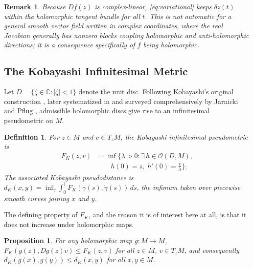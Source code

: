 \documentclass[preprint,12pt,authoryear]{elsarticle}
\newtheorem{remark}{Remark}
\newtheorem{definition}{Definition}
\newtheorem{proposition}{Proposition}
\begin{document}
\begin{remark}
Because $Df(z)$ is complex-linear, \eqref{eq:variational} keeps $\delta z(t)$ within the holomorphic tangent bundle for all $t$. This is not automatic for a general smooth vector field written in complex coordinates, where the real Jacobian generally has nonzero blocks coupling holomorphic and anti-holomorphic directions; it is a consequence specifically of $f$ being holomorphic.
\end{remark}

\subsection{The Kobayashi Infinitesimal Metric}

Let $D=\{\zeta\in\mathbb{C}:|\zeta|<1\}$ denote the unit disc. Following Kobayashi's original construction \cite{kobayashi1967invariant}, later systematized in \cite{kobayashi1998hyperbolic} and surveyed comprehensively by Jarnicki and Pflug \cite{jarnicki2013invariant}, admissible holomorphic discs give rise to an infinitesimal pseudometric on $M$.

\begin{definition}
\label{def:FK}
For $z\in M$ and $v\in T_zM$, the Kobayashi infinitesimal pseudometric is
\begin{equation}
\label{eq:FK}
\begin{aligned}
F_K(z,v)
&=
\inf\Big\{\lambda>0:\exists\,h\in\mathcal{O}(D,M),\\
&\qquad h(0)=z,\;
h'(0)=\frac{v}{\lambda}\Big\}.
\end{aligned}
\end{equation}
The associated Kobayashi pseudodistance is $d_K(x,y)=\inf_\gamma\int_0^1 F_K(\gamma(s),\dot\gamma(s))\,ds$, the infimum taken over piecewise smooth curves joining $x$ and $y$.
\end{definition}

The defining property of $F_K$, and the reason it is of interest here at all, is that it does not increase under holomorphic maps.

\begin{proposition}
\label{prop:schwarzpick}
For any holomorphic map $g:M\to M$, $F_K(g(z),Dg(z)v)\le F_K(z,v)$ for all $z\in M$, $v\in T_zM$, and consequently $d_K(g(x),g(y))\le d_K(x,y)$ for all $x,y\in M$.
\end{proposition}
\end{document}

